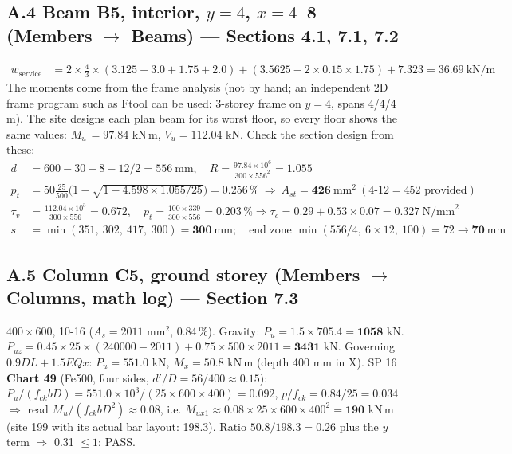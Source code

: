 \documentclass[10pt,a4paper]{article}
\newcommand{\fck}{f_{ck}}
\begin{document}
\subsection*{A.4 Beam B5, interior, $y=4$, $x=4$--8 (Members $\rightarrow$ Beams) --- Sections 4.1, 7.1, 7.2}
\begin{align*}
w_\text{service}&=2\times\tfrac43\times(3.125+3.0+1.75+2.0)+(3.5625-2\times0.15\times1.75)+7.323=\mathbf{36.69}\ \text{kN/m}
\end{align*}
The moments come from the frame analysis (not by hand; an independent 2D frame program such as Ftool can be used:
3-storey frame on $y=4$, spans 4/4/4 m). The site designs each plan beam for its worst floor, so every floor shows
the same values: $M_u^-=97.84$ kN\,m, $V_u=112.04$ kN. Check the section design from these:
\begin{align*}
d&=600-30-8-12/2=556\ \text{mm},\quad R=\frac{97.84\times10^6}{300\times556^2}=1.055\\
p_t&=50\tfrac{25}{500}\Big(1-\sqrt{1-4.598\times1.055/25}\Big)=0.256\,\%\ \Rightarrow\ A_{st}=\mathbf{426}\ \text{mm}^2
\ (4\text{-}12 = 452 \text{ provided})\\
\tau_v&=\frac{112.04\times10^3}{300\times556}=\mathbf{0.672},\quad p_t=\frac{100\times339}{300\times556}=0.203\,\%
\Rightarrow\tau_c=0.29+0.53\times0.07=\mathbf{0.327}\ \text{N/mm}^2\\
s&=\min(351,\ 302,\ 417,\ 300)=\mathbf{300}\ \text{mm};\quad \text{end zone }\min(556/4,\ 6\times12,\ 100)=72\rightarrow\mathbf{70}\ \text{mm}
\end{align*}

\subsection*{A.5 Column C5, ground storey (Members $\rightarrow$ Columns, math log) --- Section 7.3}
$400\times600$, 10-16 ($A_s=2011$ mm$^2$, 0.84\,\%). Gravity: $P_u=1.5\times705.4=\mathbf{1058}$ kN.
$P_{uz}=0.45\times25\times(240000-2011)+0.75\times500\times2011=\mathbf{3431}$ kN.
Governing $0.9DL+1.5EQx$: $P_u=551.0$ kN, $M_x=50.8$ kN\,m (depth 400 mm in X).
SP 16 \textbf{Chart 49} (Fe500, four sides, $d'/D=56/400\approx0.15$):
$P_u/(\fck bD)=551.0\times10^3/(25\times600\times400)=0.092$, $p/\fck=0.84/25=0.034$ $\Rightarrow$ read
$M_u/(\fck bD^2)\approx0.08$, i.e. $M_{ux1}\approx0.08\times25\times600\times400^2=\mathbf{190}$ kN\,m (site 199 with
its actual bar layout: 198.3). Ratio $50.8/198.3=0.26$ plus the $y$ term $\Rightarrow$ 0.31 $\le1$: PASS.
\end{document}

